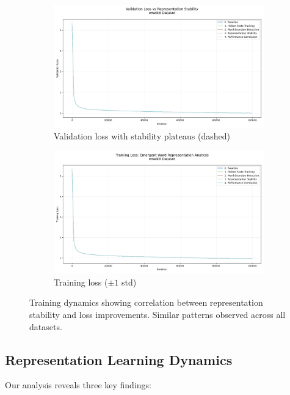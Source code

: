\documentclass{article} %
\begin{document}
\begin{figure}[h]
    \centering
    \begin{subfigure}{0.48\textwidth}
        \includegraphics[width=\textwidth]{val_loss_enwik8.png}
        \caption{Validation loss with stability plateaus (dashed)}
        \label{fig:val_loss}
    \end{subfigure}
    \hfill
    \begin{subfigure}{0.48\textwidth}
        \includegraphics[width=\textwidth]{train_loss_enwik8.png}
        \caption{Training loss ($\pm1$ std)}
        \label{fig:train_loss}
    \end{subfigure}
    \caption{Training dynamics showing correlation between representation stability and loss improvements. Similar patterns observed across all datasets.}
    \label{fig:training}
\end{figure}

\subsection{Representation Learning Dynamics}
Our analysis reveals three key findings:
\end{document}
